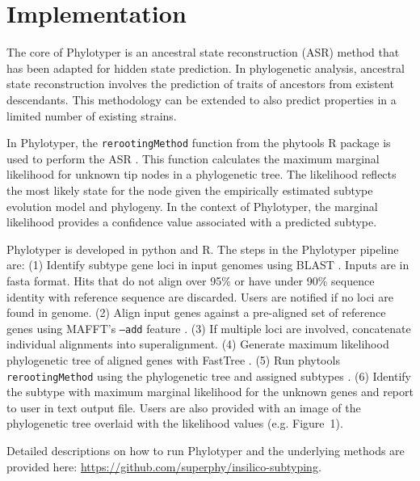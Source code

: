 \documentclass{bioinfo}
\begin{document}
\section{Implementation}

The core of Phylotyper is an ancestral state reconstruction (ASR) method that has been adapted for hidden state prediction.
In phylogenetic analysis, ancestral state reconstruction involves the prediction of traits of ancestors from existent descendants.
This methodology can be extended to also predict properties in a limited number of existing strains.

In Phylotyper, the \texttt{rerootingMethod} function from the phytools R package is used to perform the ASR \citep{Revell2011}.
This function calculates the maximum marginal likelihood for unknown tip nodes in a phylogenetic tree.
The likelihood reflects the most likely state for the node given the empirically estimated subtype evolution model and phylogeny.
In the context of Phylotyper, the marginal likelihood provides a confidence value associated with a predicted subtype.

Phylotyper is developed in python and R. 
The steps in the Phylotyper pipeline are: 
(1) Identify subtype gene loci in input genomes using BLAST \citep{Camacho2009}. Inputs are in fasta format. Hits that do not align over 95\% or have under 90\% sequence identity with reference sequence are discarded. Users are notified if no loci are found in genome.
(2) Align input genes against a pre-aligned set of reference genes using MAFFT's \texttt{--add} feature \citep{Katoh2013}.
(3) If multiple loci are involved, concatenate individual alignments into superalignment.
(4) Generate maximum likelihood phylogenetic tree of aligned genes with FastTree \citep{Price2010}.
(5) Run phytools \texttt{rerootingMethod} using the phylogenetic tree and assigned subtypes \citep{Revell2011}.
(6) Identify the subtype with maximum marginal likelihood for the unknown genes and report to user in text output file.
Users are also provided with an image of the phylogenetic tree overlaid with the likelihood values (e.g. Figure~1\vphantom{\ref{fig:01}}).

Detailed descriptions on how to run Phylotyper and the underlying methods are provided here: \url{https://github.com/superphy/insilico-subtyping}.
\end{document}
